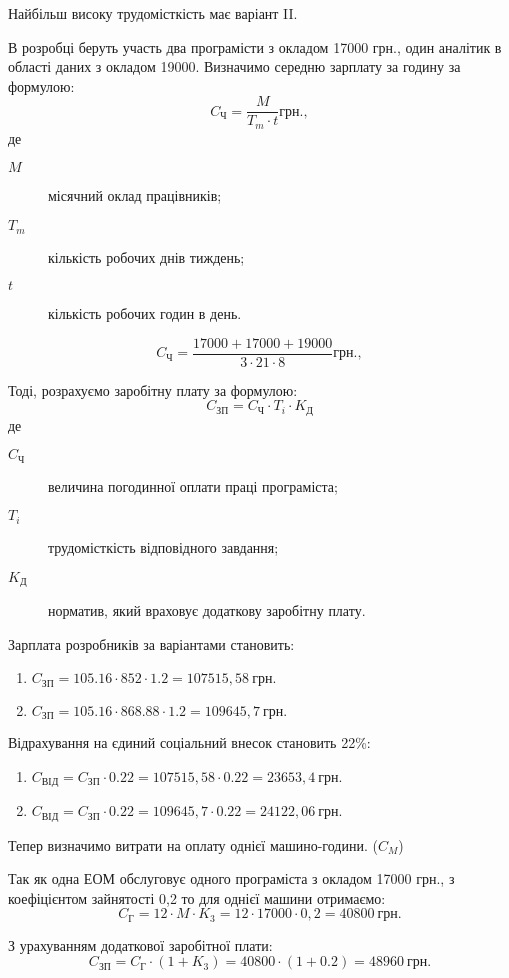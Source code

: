 \documentclass[../diploma]{subfiles}
\begin{document}
Найбільш високу трудомісткість має варіант II.

В розробці беруть участь два програмісти з окладом 17000 грн., один аналітик в області даних з окладом 19000. Визначимо середню зарплату за годину за формулою:
$$
C_Ч = \frac{M}{T_m\cdot t} грн.,
$$
де
\begin{description}
\item[$M$] місячний оклад працівників;
\item[$T_m$] кількість робочих днів тиждень;
\item[$t$] кількість робочих годин в день.
\end{description}

$$
C_Ч = \frac{17000 + 17000 + 19000}{3\cdot 21\cdot 8} грн.,
$$

Тоді, розрахуємо заробітну плату за формулою:
$$
C_{ЗП} = C_Ч\cdot T_i\cdot K_Д
$$
де
\begin{description}
\item[$C_Ч$] величина погодинної оплати праці програміста;
\item[$T_i$] трудомісткість відповідного завдання;
\item[$K_Д$] норматив, який враховує додаткову заробітну плату.
\end{description}

Зарплата розробників за варіантами становить:
\begin{enumerate}[label=\Roman*.]
\item $C_{ЗП} = 105.16\cdot 852\cdot 1.2 = 107515,58~грн.$
\item $C_{ЗП} = 105.16\cdot 868.88\cdot 1.2 = 109645,7~грн.$
\end{enumerate}

Відрахування на єдиний соціальний внесок становить 22\%:
\begin{enumerate}[label=\Roman*.]
\item $C_{ВІД} = C_{ЗП}\cdot 0.22 = 107515,58\cdot 0.22 = 23653,4~грн.$
\item $C_{ВІД} = C_{ЗП}\cdot 0.22 = 109645,7\cdot 0.22 = 24122,06~грн.$
\end{enumerate}

Тепер визначимо витрати на оплату однієї машино-години. ($C_M$)

Так як одна ЕОМ обслуговує одного програміста з окладом 17000 грн., з коефіцієнтом зайнятості 0,2 то для однієї машини отримаємо:
$$
C_Г = 12\cdot M\cdot K_3 = 12\cdot 17000\cdot 0,2 = 40800~грн.
$$

З урахуванням додаткової заробітної плати:
$$
C_{ЗП} = C_Г\cdot (1+K_3) = 40800\cdot (1 + 0.2) = 48960~грн.
$$
\end{document}
